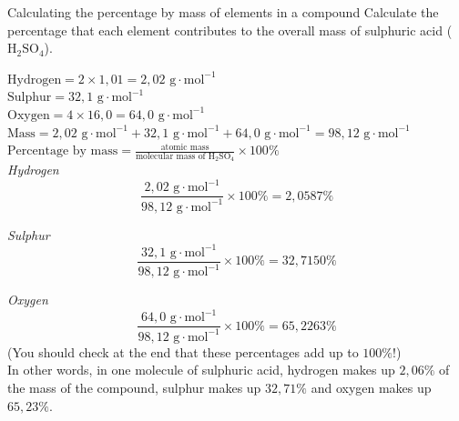       \begin{wex}{Calculating the percentage by mass of elements in a compound }
{
Calculate the percentage that each element contributes to the overall mass of sulphuric acid (${\text{H}}_{2}{\text{SO}}_{4}$).
      }
{
$\text{Hydrogen}=2 \times 1,01 = 2,02 \text{ g} \cdot \text{mol}^{-1}$ \\ 
$\text{Sulphur}=32,1 \text{ g} \cdot \text{mol}^{-1}$ \\
$\text{Oxygen}=4 \times 16,0 = 64,0 \text{ g} \cdot \text{mol}^{-1}$
$\text{Mass}=2,02 \text{ g} \cdot \text{mol}^{-1} + 32,1 \text{ g} \cdot \text{mol}^{-1} + 64,0 \text{ g} \cdot \text{mol}^{-1} = 98,12 \text{ g} \cdot \text{mol}^{-1}$
      \label{m38712*id280688}$\text{Percentage by mass}=\frac{\text{atomic mass}}{\text{molecular mass of H}{}_{2}\text{SO}{}_{4}} \times 100\%$ \\

        \textsl{Hydrogen}      
      \label{m38712*id280735}\nopagebreak\noindent{}        
    \begin{equation*}
    \frac{2,02 \text{ g} \cdot \text{mol}^{-1}}{98,12 \text{ g} \cdot \text{mol}^{-1}}\ensuremath{\times}100\%=2,0587\%
      \end{equation*}

        \textsl{Sulphur}      
      \label{m38712*id280786}\nopagebreak\noindent{}        
    \begin{equation*}
    \frac{32,1 \text{ g} \cdot \text{mol}^{-1}}{98,12 \text{ g} \cdot \text{mol}^{-1}}\ensuremath{\times}100\%=32,7150\%
      \end{equation*}

        \textsl{Oxygen}     
      \label{m38712*id280837}\nopagebreak\noindent{}
    \begin{equation*}
    \frac{64,0 \text{ g} \cdot \text{mol}^{-1}}{98,12 \text{ g} \cdot \text{mol}^{-1}}\ensuremath{\times}100\%=65,2263\%
      \end{equation*}
      \label{m38712*id280876}(You should check at the end that these percentages add up to $100\%$!) \\
      \label{m38712*id280880}In other words, in one molecule of sulphuric acid, hydrogen makes up $2,06\%$ of the mass of the compound, sulphur makes up $32,71\%$ and oxygen makes up $65,23\%$. 
}
    \end{wex}
